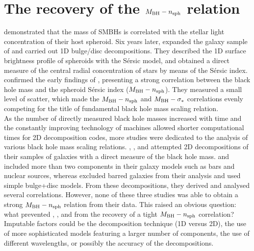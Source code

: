 \chapter{The recovery of the $M_{\rm BH} - n_{\rm sph}$ relation}
\label{ch:recov-mn}

\cite{graham2001} demonstrated that the mass of SMBHs is correlated 
with the stellar light concentration of their host spheroid. 
Six years later, \cite{grahamdriver2007} expanded the galaxy sample of \cite{graham2001} 
and carried out 1D bulge/disc decompositions. 
They described the 1D surface brightness profile of spheroids with the S\'ersic model, 
and obtained a direct measure of the central radial concentration of stars 
by means of the S\'ersic index. 
\cite{grahamdriver2007} confirmed the early findings of \cite{graham2001}, 
presenting a strong correlation between the black hole mass and the spheroid S\'ersic index ($M_{\rm BH} - n_{\rm sph}$). 
They measured a small level of scatter, 
which made the $M_{\rm BH} - n_{\rm sph}$ and $M_{\rm BH} - \sigma_*$ correlations 
evenly competing for the title of fundamental black hole mass scaling relation. \\

As the number of directly measured black hole masses increased with time and
the constantly improving technology of machines allowed shorter computational times for 2D decomposition codes, 
more studies were dedicated to the analysis of various black hole mass scaling relations. 
\cite{sani2011}, \cite{vika2012}, and \cite{beifiori2012} attempted 2D decompositions 
of their samples of galaxies with a direct measure of the black hole mass. 
\citeauthor{sani2011} and \citeauthor{vika2012} included more than two components in their galaxy models 
such as bars and nuclear sources, 
whereas \citeauthor{beifiori2012} excluded barred galaxies from their analysis 
and used simple bulge+disc models. 
From these decompositions, they derived and analysed several correlations. 
However, none of these three studies was able to obtain a strong $M_{\rm BH} - n_{\rm sph}$ relation from their data. 
This raised an obvious question: 
what prevented \citeauthor{sani2011}, \citeauthor{vika2012}, and \citeauthor{beifiori2012} 
from the recovery of a tight $M_{\rm BH} - n_{\rm sph}$ correlation? 
Imputable factors could be the decomposition technique (1D versus 2D), 
the use of more sophisticated models featuring a larger number of components, 
the use of different wavelengths, 
or possibly the accuracy of the decompositions. \\


